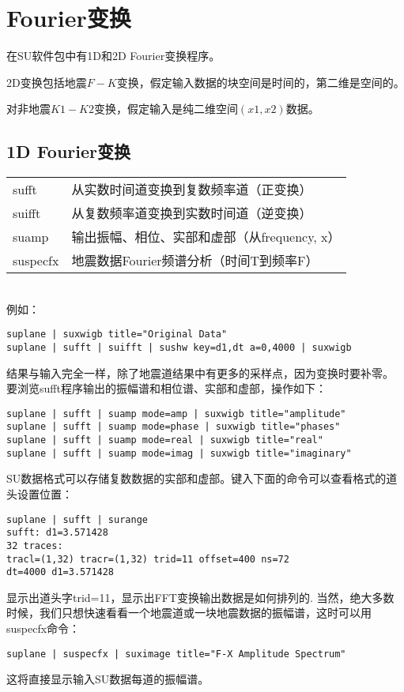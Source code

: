 \section{Fourier变换}
在SU软件包中有1D和2D Fourier变换程序。\par 
2D变换包括地震$F-K$变换，假定输入数据的块空间是时间的，第二维是空间的。\par
对非地震$K1-K2$变换，假定输入是纯二维空间$(x1, x2)$数据。
\subsection{1D Fourier变换}
\begin{tabular}{ll}
	\toprule
	sufft & 从实数时间道变换到复数频率道（正变换）\\
	suifft & 从复数频率道变换到实数时间道（逆变换）\\	
	suamp & 输出振幅、相位、实部和虚部（从frequency, x）\\	
	suspecfx & 地震数据Fourier频谱分析（时间T到频率F）\\
	\bottomrule
\end{tabular}\\
例如：
\begin{lstlisting}
suplane | suxwigb title="Original Data" 
suplane | sufft | suifft | sushw key=d1,dt a=0,4000 | suxwigb
\end{lstlisting}
结果与输入完全一样，除了地震道结果中有更多的采样点，因为变换时要补零。\\
要浏览sufft程序输出的振幅谱和相位谱、实部和虚部，操作如下：\\
\begin{lstlisting}
suplane | sufft | suamp mode=amp | suxwigb title="amplitude" 
suplane | sufft | suamp mode=phase | suxwigb title="phases" 
suplane | sufft | suamp mode=real | suxwigb title="real" 
suplane | sufft | suamp mode=imag | suxwigb title="imaginary" 
\end{lstlisting}
SU数据格式可以存储复数数据的实部和虚部。键入下面的命令可以查看格式的道头设置位置：
\begin{lstlisting}[frame=single]
suplane | sufft | surange
sufft: d1=3.571428
32 traces:
tracl=(1,32) tracr=(1,32) trid=11 offset=400 ns=72
dt=4000 d1=3.571428
\end{lstlisting}
显示出道头字trid=11，显示出FFT变换输出数据是如何排列的.
当然，绝大多数时候，我们只想快速看看一个地震道或一块地震数据的振幅谱，这时可以用suspecfx命令：
\begin{lstlisting}
suplane | suspecfx | suximage title="F-X Amplitude Spectrum" 
\end{lstlisting}
这将直接显示输入SU数据每道的振幅谱。


